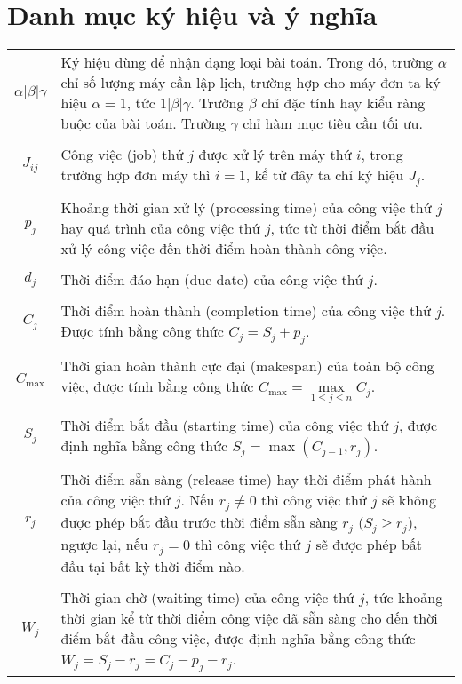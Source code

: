 \documentclass[12pt,a4paper]{report}
\begin{document}
	\chapter*{Danh mục ký hiệu và ý nghĩa}
	\thispagestyle{fancy}
	\begin{tabularx}{\linewidth}{ c  X }
		$\alpha | \beta | \gamma$ & Ký hiệu dùng để nhận dạng loại bài toán. Trong đó, trường $\alpha$ chỉ số lượng máy cần lập lịch, trường hợp cho máy đơn ta ký hiệu $\alpha = 1$, tức $1| \beta | \gamma$. Trường $\beta$ chỉ đặc tính hay kiểu ràng buộc của bài toán. Trường $\gamma$ chỉ hàm mục tiêu cần tối ưu. \\
		\\
		$J_{ij}$ & Công việc (job) thứ $j$ được xử lý trên máy thứ $i$, trong trường hợp đơn máy thì $i=1$, kể từ đây ta chỉ ký hiệu $J_j$. \\
		\\
		$p_j$ & Khoảng thời gian xử lý (processing time) của công việc thứ $j$ hay quá trình của công việc thứ $j$, tức từ thời điểm bắt đầu xử lý công việc đến thời điểm hoàn thành công việc. \\
		\\
		$d_j$ & Thời điểm đáo hạn (due date) của công việc thứ $j$. \\
		\\
		$C_j$ & Thời điểm hoàn thành (completion time) của công việc thứ $j$. Được tính bằng công thức $C_j = S_j + p_j$. \\
		\\
		$C_{\max}$ & Thời gian hoàn thành cực đại (makespan) của toàn bộ công việc, được tính bằng công thức $C_{\max} = \underset{1 \leq j \leq n}{\max} C_j$. \\
		\\
		$S_j$ & Thời điểm bắt đầu (starting time) của công việc thứ $j$, được định nghĩa bằng công thức $S_j = \max (C_{j-1}, r_j)$. \\
		\\
		$r_j$ & Thời điểm sẵn sàng (release time) hay thời điểm phát hành của công việc thứ $j$. Nếu $r_j \neq 0$ thì công việc thứ $j$ sẽ không được phép bắt đầu trước thời điểm sẵn sàng $r_j$ ($S_j \geq r_j$), ngược lại, nếu $r_j = 0$ thì công việc thứ $j$ sẽ được phép bất đầu tại bất kỳ thời điểm nào. \\
		\\
		$W_j$ & Thời gian chờ (waiting time) của công việc thứ $j$, tức khoảng thời gian kể từ thời điểm công việc đã sẵn sàng cho đến thời điểm bắt đầu công việc, được định nghĩa bằng công thức $W_j = S_j - r_j = C_j - p_j - r_j$. \\

\end{tabularx}
\end{document}
